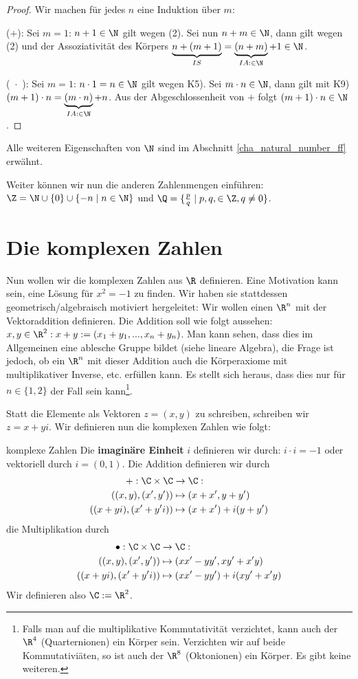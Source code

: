 \begin{proof} Wir machen für jedes $n$ eine Induktion über $m$:

($+$): Sei $m=1$: $n+1 \in \N$ gilt wegen (2). Sei nun $n+m \in \N$, dann gilt wegen (2) und der Assoziativität des Körpers  $\underbrace{n+(m+1)}_{IS} = \underbrace{(n+m)}_{IA: \in \N}+1 \in \N$.

(\ $\cdot$\ ): Sei $m = 1$: $n\cdot 1 = n \in \N$ gilt wegen K5). Sei $m \cdot n \in \N$, dann gilt mit K9) $(m + 1) \cdot n = \underbrace{(m \cdot n)}_{IA: \in \N} + n$. Aus der Abgeschlossenheit von $+$ folgt $(m + 1) \cdot n \in \N$.  
\end{proof}

Alle weiteren Eigenschaften von $\N$ sind im Abschnitt \ref{cha_natural_number_ff} erwähnt.

Weiter können wir nun die anderen Zahlenmengen einführen: $\Z = \N \cup \{0\} \cup \{-n \mid n \in \N\}$ und $\Q = \{ \frac{p}{q} \mid p,q, \in \Z, q \neq 0\}$.

\section{Die komplexen Zahlen}
Nun wollen wir die komplexen Zahlen aus $\R$ definieren. Eine Motivation kann sein, eine Lösung für $x^2 = -1$ zu finden. Wir haben sie stattdessen geometrisch/algebraisch motiviert hergeleitet: Wir wollen einen $\R^n$ mit der Vektoraddition definieren. Die Addition soll wie folgt aussehen: $x,y \in \R^2: x + y := (x_1+y_1,...,x_n+y_n)$. Man kann sehen, dass dies im Allgemeinen eine ablesche Gruppe bildet (siehe lineare Algebra), die Frage ist jedoch, ob ein $\R^n$ mit dieser Addition auch die Körperaxiome mit multiplikativer Inverse, etc. erfüllen kann. Es stellt sich heraus, dass dies nur für $n \in \{1 ,2\}$ der Fall sein kann\footnote{Falls man auf die multiplikative Kommutativität verzichtet, kann auch der $\R^4$ (Quarternionen) ein Körper sein. Verzichten wir auf beide Kommutativiäten, so ist auch der $\R^8$ (Oktonionen) ein Körper. Es gibt keine weiteren.}.

Statt die Elemente als Vektoren $z = (x, y)$ zu schreiben, schreiben wir $z = x + yi$. Wir definieren nun die komplexen Zahlen wie folgt:

\begin{definition}{komplexe Zahlen}{}
Die \textbf{imaginäre Einheit} $i$ definieren wir durch: $i\cdot i = -1$ oder vektoriell durch $i = (0, 1)$. Die Addition definieren wir durch
\begin{align*}
+: \C \times \C &\to \C:\\
((x, y), (x', y'))  &\mapsto (x + x', y + y')\\
((x + yi), (x' + y'i)) &\mapsto (x + x') + i(y + y')
\end{align*}
die Multiplikation durch
\begin{align*}
\bullet: \C\times \C  &\to \C:\\
((x, y), (x', y')) &\mapsto (xx'- yy', xy'+x'y)\\
((x + yi), (x' + y'i)) &\mapsto (xx'- yy') + i(xy'+x'y)
\end{align*}
Wir definieren also $\C := \R^2$.
\end{definition}

